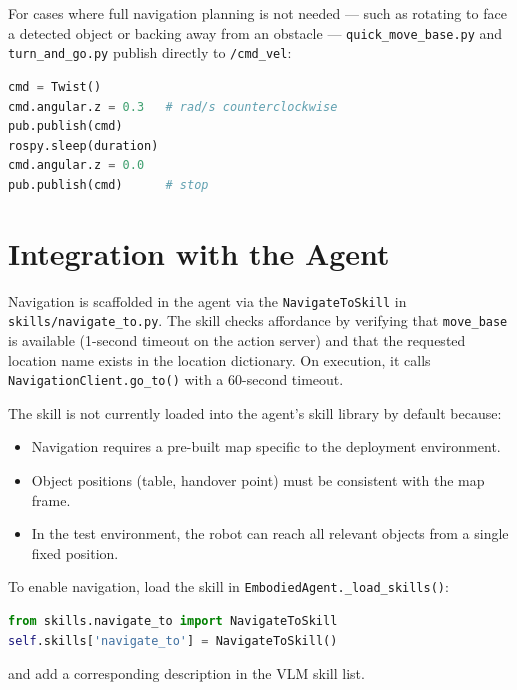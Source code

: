 For cases where full navigation planning is not needed — such as rotating to face
a detected object or backing away from an obstacle — \texttt{quick\_move\_base.py}
and \texttt{turn\_and\_go.py} publish directly to \texttt{/cmd\_vel}:

\begin{lstlisting}[language=Python, caption={Publishing a rotation command.}]
cmd = Twist()
cmd.angular.z = 0.3   # rad/s counterclockwise
pub.publish(cmd)
rospy.sleep(duration)
cmd.angular.z = 0.0
pub.publish(cmd)      # stop
\end{lstlisting}

\section{Integration with the Agent}

Navigation is scaffolded in the agent via the \texttt{NavigateToSkill} in
\texttt{skills/navigate\_to.py}.
The skill checks affordance by verifying that \texttt{move\_base} is available
(1-second timeout on the action server) and that the requested location name exists
in the location dictionary.
On execution, it calls \texttt{NavigationClient.go\_to()} with a 60-second timeout.

The skill is not currently loaded into the agent's skill library by default because:
\begin{itemize}[noitemsep]
  \item Navigation requires a pre-built map specific to the deployment environment.
  \item Object positions (table, handover point) must be consistent with the map frame.
  \item In the test environment, the robot can reach all relevant objects from
        a single fixed position.
\end{itemize}

To enable navigation, load the skill in \texttt{EmbodiedAgent.\_load\_skills()}:

\begin{lstlisting}[language=Python, caption={Enabling navigation in the agent.}]
from skills.navigate_to import NavigateToSkill
self.skills['navigate_to'] = NavigateToSkill()
\end{lstlisting}

and add a corresponding description in the VLM skill list.

